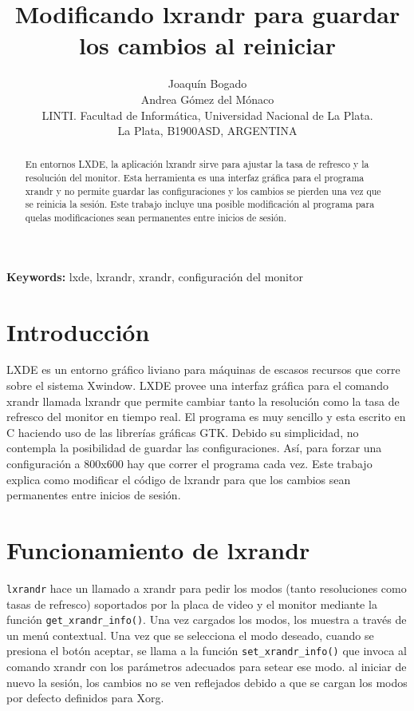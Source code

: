 \documentclass[final,narroweqnarray,inline,twoside]{ieee}
\author{Joaquín Bogado\\ Andrea Gómez del Mónaco
\\LINTI. Facultad de Informática, Universidad Nacional de La Plata.
\\La Plata, B1900ASD, ARGENTINA
}
\title{Modificando lxrandr para guardar los cambios al reiniciar}
\begin{document}
\maketitle
\sloppy

\begin{abstract}
En entornos LXDE, la aplicación lxrandr sirve para ajustar la tasa de refresco y la resolución del monitor. Esta herramienta
es una interfaz gráfica para el programa xrandr y no permite guardar las configuraciones y los cambios se pierden una vez
que se reinicia la sesión. Este trabajo incluye una posible modificación al programa para quelas modificaciones sean
permanentes entre inicios de sesión.
\end{abstract}

\noindent \textbf{Keywords: } lxde, lxrandr, xrandr, configuración del monitor

\section{Introducción}
LXDE es un entorno gráfico liviano para máquinas de escasos recursos que corre sobre el sistema Xwindow. LXDE provee una
interfaz gráfica para el comando xrandr llamada lxrandr que permite cambiar tanto la resolución como la tasa de refresco del
monitor en tiempo real. El programa es muy sencillo y esta escrito en C haciendo uso de las librerías gráficas GTK. Debido
su simplicidad, no contempla la posibilidad de guardar las configuraciones. Así, para forzar una configuración a 800x600 hay
que correr el programa cada vez. Este trabajo explica como modificar el código de lxrandr para que los cambios sean
permanentes entre inicios de sesión. 

\section{Funcionamiento de lxrandr}
\texttt{lxrandr} hace un llamado a xrandr para pedir los modos (tanto resoluciones como tasas de refresco) soportados por la
placa de video y el monitor mediante la función \texttt{get\_xrandr\_info()}. Una vez cargados los modos, los muestra
a través de un menú contextual. Una vez que se selecciona el modo deseado, cuando se presiona el botón aceptar, se llama a
la función \texttt{set\_xrandr\_info()} que invoca al comando xrandr con los parámetros adecuados para setear ese modo.
al iniciar de nuevo la sesión, los cambios no se ven reflejados debido a que se cargan los modos por defecto definidos
para Xorg.
\end{document}
